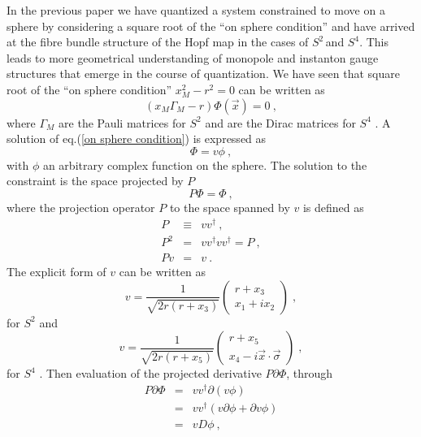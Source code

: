 \documentclass[12pt,a4paper]{article}
\begin{document}
In the previous paper \cite{Ikemori:1999yf} we have quantized a system
constrained to move on a sphere by considering a square root of the ``on
sphere condition'' and have arrived at the fibre bundle structure of the
Hopf map in the cases of $S^{2}\,$and $S^{4}$. This leads to more
geometrical understanding of monopole and instanton gauge structures that
emerge in the course of quantization. We have seen that square root of the
``on sphere condition'' ${x}_{M}^{2}-r^{2}=0$ can be written as 
\begin{equation}
\left( x_{M}\Gamma _{M}-r\right) \Phi \left( \vec{x}\right) =0\ ,
\label{on sphere condition}
\end{equation}
where $\Gamma _{M}$ are the Pauli matrices for $S^{2}$ and are the Dirac
matrices for $S^{4}$ . A solution of eq.(\ref{on sphere condition}) is
expressed as 
\begin{equation}
\Phi =v\phi \ ,
\end{equation}
with $\phi $ an arbitrary complex function on the sphere. The solution to
the constraint is the space projected by $P$%
\begin{equation}
P\Phi =\Phi \ ,
\end{equation}
where the projection operator $P$ to the space spanned by $v$ is defined as 
\begin{eqnarray}
P &\equiv &vv^{\dag }\ , \\
P^{2} &=&vv^{\dag }vv^{\dag }=P\ ,  \nonumber \\
Pv &=&v\ .  \nonumber
\end{eqnarray}
The explicit form of $v$ can be written as 
\begin{equation}
v=\frac{1}{\sqrt{2r\left( r+x_{3}\right) }}\left( 
\begin{array}{c}
r+x_{3} \\ 
x_{1}+ix_{2}
\end{array}
\right) \;,  \label{v2}
\end{equation}
for $S^{2}$ and 
\begin{equation}
v=\frac{1}{\sqrt{2r\left( r+x_{5}\right) }}\left( 
\begin{array}{c}
r+x_{5} \\ 
x_{4}-i\vec{x}\cdot \vec{\sigma}
\end{array}
\right) \;,
\end{equation}
for $S^{4}$ . Then evaluation of the projected derivative $P\partial \Phi $,
through 
\begin{eqnarray}
P\partial \Phi &=&vv^{\dag }\partial \left( v\phi \right) \\
&=&vv^{\dag }\left( v\partial \phi +\partial v\phi \right)  \nonumber \\
&=&vD\phi \ ,  \nonumber
\end{eqnarray}
\end{document}

